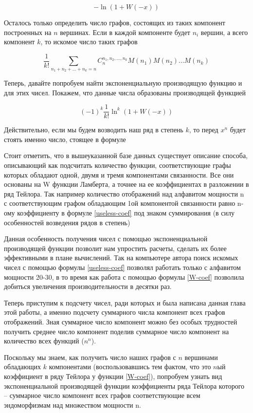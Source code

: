 \documentclass[10pt, a4paper]{report}
\renewcommand{\log}{\ln}
\begin{document}
$$
-\log(1+W(-x))
$$


Осталось только определить число графов, состоящих из таких компонент построенных на $n$ вершинах. 
Если в каждой компоненте будет $n_i$ вершин, а всего компонент $k$, то искомое число таких графов

\begin{equation}
\label{useless-coef}
\frac 1 {k!} \sum_{n_1+n_2+...+n_k=n} C^{n_1, n_2, ..., n_k}_n M(n_1)M(n_2)...M(n_k)
\end{equation}

Теперь, давайте попробуем найти экспоненциальную производящую функцию и для этих чисел. Покажем, что данные числа образованы производящей функцией

\begin{equation}
\label{W-coef}
(-1)^k \frac 1 {k!} \ln^k(1+W(-x))
\end{equation}

Действительно, если мы будем возводить наш ряд в степень $k$, то перед $x^n$ будет стоять именно число, стоящее в формуле 

Стоит отметить, что в вышеуказанной базе данных существует описание способа, описывающий как подсчитать количество функции, соответствующие графы которых обладают одной, двумя и тремя компонентами связанности. Все они основаны на W функции Ламберта, а точнее на ее коэффициентах в разложении в ряд Тейлора. 
Так например количество отображений над алфавитом мощности n с соответствующим графом обладающим 1ой компонентой связанности равно n-ому коэффициенту в формуле \eqref{useless-coef} под знаком суммирования (в силу особенностей возведения рядов в степень)

Данная особенность получения чисел с помощью экспоненциальной производящей функции позволит нам упростить расчеты, сделать их более эффективными в плане вычислений. Так на компьютере автора поиск искомых чисел с помощью формулы \eqref{useless-coef} позволял работать только с алфавитом мощности 20-30, в то время как работа с помощью формулы \eqref{W-coef} позволила добиться увеличения производительности в десятки раз.

Теперь приступим к подсчету чисел, ради которых и была написана данная глава этой работы, а именно подсчету суммарного числа компонент всех графов отображений. Зная суммарное число компонент можно без особых трудностей получить среднее число компонент поделив суммарное число компонент на количество всех функций ($n^n$).

Поскольку мы знаем, как получить число наших графов с $n$ вершинами обладающих $k$ компонентами (воспользовавшись тем фактом, что это $n$ый коэффициент в ряду Тейлора у функции \eqref{W-coef}), попробуем узнать вид экспоненциальной производящей функции коэффициенты ряда Тейлора которого -- суммарное число компонент всех графов соответствующие всем эндоморфизмам над множеством мощности n.
\end{document}

